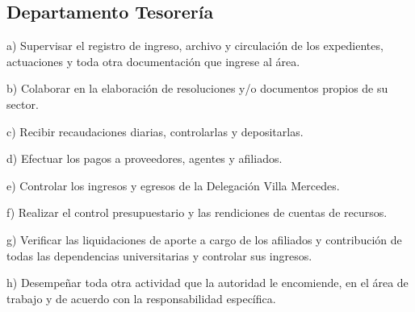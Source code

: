 \subsection{Departamento Tesorería}
\begin{displayquote}
a) Supervisar el registro de ingreso, archivo y circulación de los expedientes, actuaciones y toda otra documentación que ingrese al área.

b) Colaborar en la elaboración de resoluciones y/o documentos propios de su sector.

c) Recibir recaudaciones diarias, controlarlas y depositarlas.

d) Efectuar los pagos a proveedores, agentes y afiliados.

e) Controlar los ingresos y egresos de la Delegación Villa Mercedes.

f) Realizar el control presupuestario y las rendiciones de cuentas de recursos.

g) Verificar las liquidaciones de aporte a cargo de los afiliados y contribución de todas las dependencias universitarias y controlar sus ingresos.

h) Desempeñar toda otra actividad que la autoridad le encomiende, en el área de trabajo y de acuerdo con la responsabilidad específica.
\hfill\parencite{CSOrd17}
\end{displayquote}

